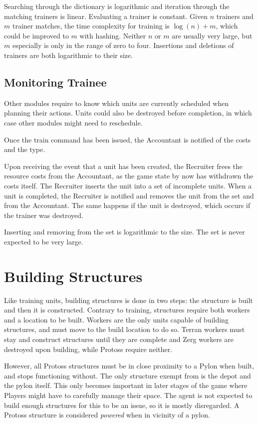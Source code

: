 	Searching through the dictionary is logarithmic and iteration through the matching trainers is linear. Evaluating a trainer is constant. Given $n$ trainers and $m$ trainer matches, the time complexity for training is $\log(n) + m$, which could be improved to $m$ with hashing. Neither $n$ or $m$ are usually very large, but $m$ especially is only in the range of zero to four. Insertions and deletions of trainers are both logarithmic to their size.

	\subsection*{Monitoring Trainee}
	Other modules require to know which units are currently scheduled when planning their actions. Units could also be destroyed before completion, in which case other modules might need to reschedule.
	
	Once the train command has been issued, the Accountant is notified of the costs and the type.
	
	Upon receiving the event that a unit has been created, the Recruiter frees the resource costs from the Accountant, as the game state by now has withdrawn the costs itself. The Recruiter inserts the unit into a set of incomplete units. When a unit is completed, the Recruiter is notified and removes the unit from the set and from the Accountant. The same happens if the unit is destroyed, which occurs if the trainer was destroyed.
	
	Inserting and removing from the set is logarithmic to the size. The set is never expected to be very large.

\section{Building Structures}
Like training units, building structures is done in two steps: the structure is built and then it is constructed. Contrary to training, structures require both workers and a location to be built. Workers are the only units capable of building structures, and must move to the build location to do so. Terran workers must stay and construct structures until they are complete and Zerg workers are destroyed upon building, while Protoss require neither.

However, all Protoss structures must be in close proximity to a Pylon when built, and stops functioning without. The only structure exempt from is the depot and the pylon itself. This only becomes important in later stages of the game where Players might have to carefully manage their space. The agent is not expected to build enough structures for this to be an issue, so it is mostly disregarded. A Protoss structure is considered \emph{powered} when in vicinity of a pylon.


